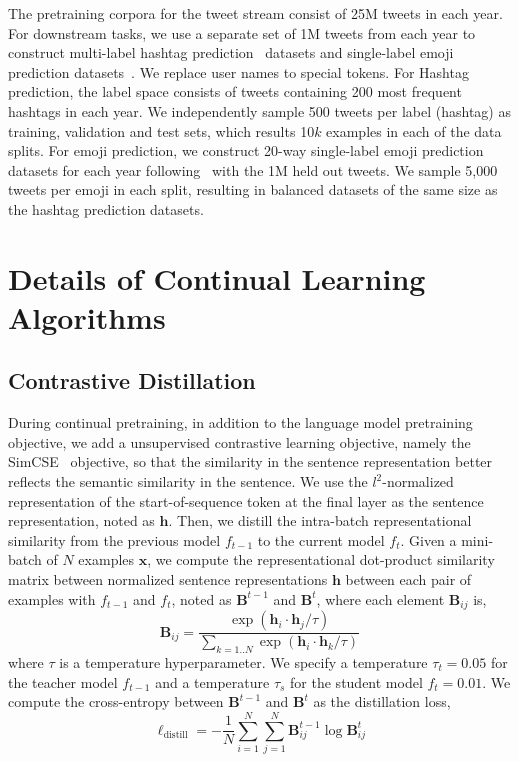 The pretraining corpora for the tweet stream consist of 25M tweets in each year. 
For downstream tasks, we use a separate set of 1M tweets from each year to construct multi-label hashtag prediction~\cite{Gong2016HashtagRU} datasets and single-label emoji prediction datasets~\cite{Barbieri2018SemEval2T}. We replace user names to special tokens. For Hashtag prediction, the label space consists of tweets containing 200 most frequent hashtags in each year. We independently sample 500 tweets per label (hashtag) as training, validation and test sets, which results 10$k$ examples in each of the data splits. For emoji prediction, we construct 20-way single-label emoji prediction datasets for each year following~\citet{Barbieri2018SemEval2T} with the 1M held out tweets. We sample 5,000 tweets per emoji in each split, resulting in balanced datasets of the same size as the hashtag prediction datasets.

\section{Details of Continual Learning Algorithms}
\label{apdx:cl}
\subsection{Contrastive Distillation}
During continual pretraining, in addition to the language model pretraining objective, we add a unsupervised contrastive learning objective, namely the SimCSE~\cite{Gao2021SimCSESC} objective, so that the similarity in the sentence representation better reflects the semantic similarity in the sentence. 
We use the $l^2$-normalized representation of the start-of-sequence token at the final layer as the sentence representation, noted as $\bm{h}$. Then, we distill the intra-batch representational similarity from the previous model $f_{t-1}$ to the current model $f_t$. Given a mini-batch of $N$ examples $\bm{x}$, we compute the representational dot-product similarity matrix between normalized sentence representations $\bm{h}$ between each pair of examples with $f_{t-1}$ and $f_t$, noted as $\mathbf{B}^{t-1}$ and $\mathbf{B}^{t}$, where each element $\mathbf{B}_{ij}$ is, 
\begin{equation}
    \label{eq:normalize}
    \mathbf{B}_{ij} = \frac{\exp(\bm{h}_i \cdot \bm{h}_j / \tau)}{\sum_{k=1..N}\exp(\bm{h}_i \cdot \bm{h}_k / \tau)}
\end{equation}
where $\tau$ is a temperature hyperparameter. We specify a temperature $\tau_t=0.05$ for the teacher model $f_{t-1}$ and a temperature $\tau_s$ for the student model $f_t=0.01$. We compute the cross-entropy between $\mathbf{B}^{t-1}$ and $\mathbf{B}^{t}$ as the distillation loss,
\begin{equation}
    \label{eq:contrastive_distill}
    \ell_{\text{distill}} = - \frac{1}{N} \sum_{i=1}^{N} \sum_{j=1}^{N} \mathbf{B}_{ij}^{t-1}\log \mathbf{B}_{ij}^{t}
\end{equation}

